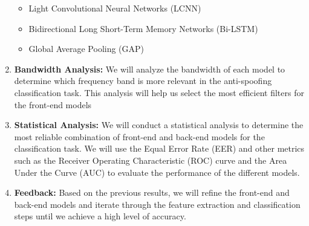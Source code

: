 \begin{enumerate}
    \begin{itemize}
        \item Light Convolutional Neural Networks (LCNN)
        \item Bidirectional Long Short-Term Memory Networks (Bi-LSTM)
        \item Global Average Pooling (GAP)
    \end{itemize}
    \item \textbf{Bandwidth Analysis:} We will analyze the bandwidth of each model to determine which frequency band is more relevant in the anti-spoofing classification task. This analysis will help us select the most efficient filters for the front-end models
    \item \textbf{Statistical Analysis:} We will conduct a statistical analysis to determine the most reliable combination of front-end and back-end models for the classification task. We will use the Equal Error Rate (EER) and other metrics such as the Receiver Operating Characteristic (ROC) curve and the Area Under the Curve (AUC) to evaluate the performance of the different models.
    \item \textbf{Feedback:} Based on the previous results, we will refine the front-end and back-end models and iterate through the feature extraction and classification steps until we achieve a high level of accuracy.
\end{enumerate}



\endinput
